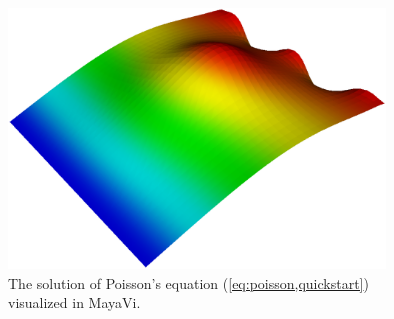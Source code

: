 \begin{figure}[htbp]
  \begin{center}
    \includegraphics[width=10cm]{eps/poisson.eps}
    \caption{The solution of Poisson's equation (\ref{eq:poisson,quickstart})
      visualized in MayaVi.}
  \end{center}
\end{figure}
